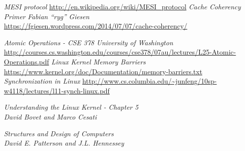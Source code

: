 \documentclass{article}
\begin{document}
\begin{thebibliography}{9}
  \textit{MESI protocol} 
  \url{http://en.wikipedia.org/wiki/MESI_protocol}
   \textit{Cache Coherency Primer}  \textit{Fabian “ryg” Giesen} \\
   \url{https://fgiesen.wordpress.com/2014/07/07/cache-coherency/}

   \textit{Atomic Operations - CSE 378 University of Washington} \\
  \url{http://courses.cs.washington.edu/courses/cse378/07au/lectures/L25-Atomic-Operations.pdf}
  \textit{Linux Kernel Memory Barriers}
  \url{https://www.kernel.org/doc/Documentation/memory-barriers.txt}
  \textit{Synchronization in Linux}
  \url{http://www.cs.columbia.edu/~junfeng/10sp-w4118/lectures/l11-synch-linux.pdf}

  \textit{Understanding the Linux Kernel - Chapter 5} \\
  \textit{David Bovet and Marco Cesati}  

  \textit{Structures and Design of Computers } \\
  \textit{David E. Patterson and J.L. Hennessey} 
  

\end{thebibliography}
\end{document}
